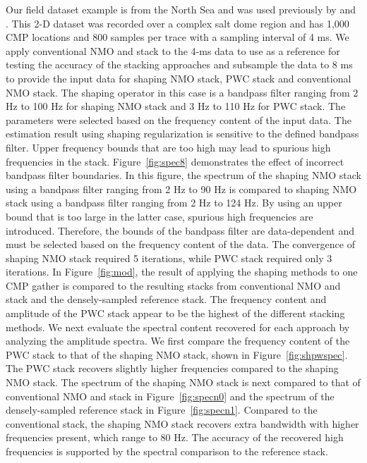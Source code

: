 Our field dataset example is from the North Sea and was used previously by \cite{fomel4} and \cite{fomel3}. 
This 2-D dataset was recorded over a complex salt dome region and has 1,000 CMP locations and 800 samples 
per trace with a sampling interval of 4 ms. 
We apply conventional NMO and stack to the 4-ms data to use as a reference for testing the accuracy of the stacking 
approaches and subsample the data to 8 ms to provide the input data for shaping NMO stack, PWC stack and conventional NMO stack. 
The shaping operator in this case is a bandpass filter ranging from 2 Hz to 100 Hz for shaping NMO stack and 
3 Hz to 110 Hz for PWC stack. The parameters were selected based on the frequency content of the input data. 
The estimation result using shaping regularization is sensitive to the defined bandpass filter. 
Upper frequency bounds that are too high may lead to spurious high frequencies in the stack. 
Figure~\ref{fig:spec8} demonstrates the effect of incorrect bandpass filter boundaries. 
In this figure, the spectrum of the shaping NMO stack using a bandpass filter ranging from 2 Hz to 90 Hz is compared to 
shaping NMO stack using a bandpass filter ranging from 2 Hz to 124 Hz. By using an upper bound that is too
large in the latter case, spurious high frequencies are introduced. Therefore, the bounds of the bandpass filter
are data-dependent and must be selected based on the frequency content of the data.
The convergence of shaping NMO stack required 5 iterations, while PWC stack required only 3 iterations. 
In Figure~\ref{fig:mod}, the result of applying the shaping methods to one CMP gather is compared to the resulting stacks from conventional
NMO and stack and the densely-sampled reference stack.
The frequency content and amplitude of the PWC stack appear to be the highest of the different stacking methods. We next evaluate the spectral content recovered for each approach by analyzing the amplitude spectra. We first compare the frequency content of the PWC stack to that of the shaping NMO stack, shown in Figure~\ref{fig:shpwspec}. 
The PWC stack recovers slightly higher frequencies compared to the shaping NMO stack. 
The spectrum of the shaping NMO stack is next compared to that of conventional NMO and stack in Figure~\ref{fig:specn0} 
and the spectrum of the densely-sampled reference stack in Figure~\ref{fig:specn1}. Compared to the conventional stack, the 
shaping NMO stack recovers extra bandwidth with higher frequencies present, which range to 80 Hz. 
The accuracy of the recovered high frequencies is supported by the spectral comparison to the reference stack.
